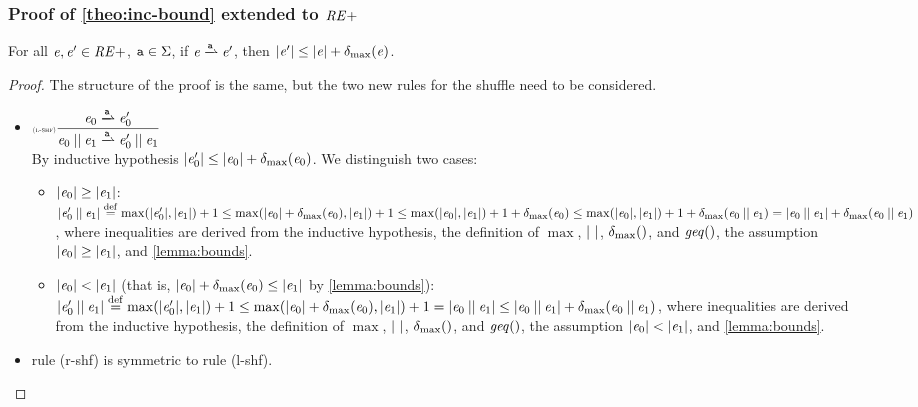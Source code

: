 \subsubsection*{Proof of \cref{theo:inc-bound} extended to $\mathit {RE+}$
}
For all $\mathit {e},\mathit {e}'\in\mathit {RE+}$, $\mathtt {a}\in\Sigma$, if $\re\parDer{\sym}\re'$, then ${\mid}{\mathit {e}'}{\mid}\leq {\mid}{\ensuremath{\mathit {e}}}{\mid}+{\delta_{\max}}({\mathit {e}})$.

\begin{proof}
 The structure of the proof is the same, but the two new rules for the shuffle need to be considered.
 \begin{itemize}
  \item $\Rule{l-shf}{\re_0\parDer{\sym}\re'_0}{\re_0\shuffleop\re_1\parDer{\sym}\re'_0\shuffleop\re_1}{}$\\[2ex]
        By inductive hypothesis ${\mid}{\mathit {e}_0'}{\mid}\leq {\mid}{\ensuremath{\mathit {e}}_0}{\mid}+{\delta_{\max}}({\mathit {e}_0})$.
        We distinguish two cases:
        \begin{itemize}
         \item ${\mid}{\mathit {e}_0}{\mid}\geq{\mid}{\ensuremath{\mathit {e}}_1}{\mid}$:
               ${\mid}{\mathit {e}_0'\mathbin{||}\mathit {e}_1}{\mid}\stackrel{\mathrm{def}}{=}\max({\mid}{\mathit {e}'_0}{\mid},{\mid}{\mathit {e}_1}{\mid})+1\leq\max({\mid}{\mathit {e}_0}{\mid}+{\delta_{\max}}({\mathit {e}_0}),{\mid}{\mathit {e}_1}{\mid})+1\leq\max({\mid}{\mathit {e}_0}{\mid},{\mid}{\mathit {e}_1}{\mid})+1+{\delta_{\max}}({\mathit {e}_0})\leq\max({\mid}{\mathit {e}_0}{\mid},{\mid}{\mathit {e}_1}{\mid})+1+{\delta_{\max}}({\mathit {e}_0\mathbin{||}\mathit {e}_1})={\mid}{\mathit {e}_0\mathbin{||}\mathit {e}_1}{\mid}+{\delta_{\max}}({\mathit {e}_0\mathbin{||}\mathit {e}_1})$, where inequalities are derived from the inductive hypothesis, the definition of $\max$, ${\mid}{\ }{\mid}$, ${\delta_{\max}}({})$, and $\mathit{geq}()$, the assumption ${\mid}{\mathit {e}_0}{\mid}\geq{\mid}{\ensuremath{\mathit {e}}_1}{\mid}$, and \cref{lemma:bounds}.

         \item ${\mid}{\mathit {e}_0}{\mid}<{\mid}{\mathit {e}_1}{\mid}$ (that is, ${\mid}{\mathit {e}_0}{\mid}+{\delta_{\max}}({\mathit {e}_0})\leq{\mid}{\ensuremath{\mathit {e}}_1}{\mid}$ by \cref{lemma:bounds}):
               ${\mid}{\mathit {e}_0'\mathbin{||}\mathit {e}_1}{\mid}\stackrel{\mathrm{def}}{=}\max({\mid}{\mathit {e}'_0}{\mid},{\mid}{\mathit {e}_1}{\mid})+1\leq\max({\mid}{\mathit {e}_0}{\mid}+{\delta_{\max}}({\mathit {e}_0}),{\mid}{\mathit {e}_1}{\mid})+1={\mid}{\mathit {e}_0\mathbin{||}\mathit {e}_1}{\mid}\leq{\mid}{\ensuremath{\mathit {e}}_0\mathbin{||}\ensuremath{\mathit {e}}_1}{\mid}+{\delta_{\max}}({\mathit {e}_0\mathbin{||}\mathit {e}_1})$, where inequalities are derived from the inductive hypothesis, the definition of $\max$, ${\mid}{\ }{\mid}$, ${\delta_{\max}}({})$, and $\mathit{geq}()$, the assumption ${\mid}{\mathit {e}_0}{\mid}<{\mid}{\mathit {e}_1}{\mid}$, and \cref{lemma:bounds}.
        \end{itemize}
  \item rule (r-shf) is symmetric to rule (l-shf).
 \end{itemize}
\end{proof}

